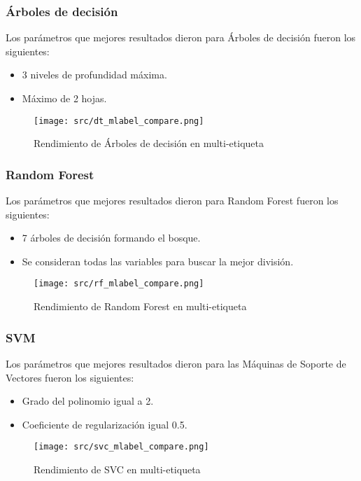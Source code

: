 \subsubsection*{Árboles de decisión}
Los parámetros que mejores resultados dieron para Árboles de decisión fueron los siguientes:
\begin{itemize}
	\item 3 niveles de profundidad máxima.
	\item Máximo de 2 hojas.
\end{itemize}
\begin{figure}[H]
	\centering
	\texttt{[image: src/dt\_mlabel\_compare.png]}
	\caption{Rendimiento de Árboles de decisión en multi-etiqueta}
	\label{fig:dtml_cmp}
\end{figure}
\subsubsection*{Random Forest}
Los parámetros que mejores resultados dieron para Random Forest fueron los siguientes:
\begin{itemize}
	\item 7 árboles de decisión formando el bosque.
	\item Se consideran todas las variables para buscar la mejor división.
\end{itemize}
\begin{figure}[H]
	\centering
	\texttt{[image: src/rf\_mlabel\_compare.png]}
	\caption{Rendimiento de Random Forest en multi-etiqueta}
	\label{fig:rfml_cmp}
\end{figure}
\subsubsection*{SVM}
Los parámetros que mejores resultados dieron para las Máquinas de Soporte de Vectores fueron los siguientes:
\begin{itemize}
	\item Grado del polinomio igual a 2.
	\item Coeficiente de regularización igual 0.5.
\end{itemize}
\begin{figure}[H]
	\centering
	\texttt{[image: src/svc\_mlabel\_compare.png]}
	\caption{Rendimiento de SVC en multi-etiqueta}
	\label{fig:svcml_cmp}
\end{figure}
